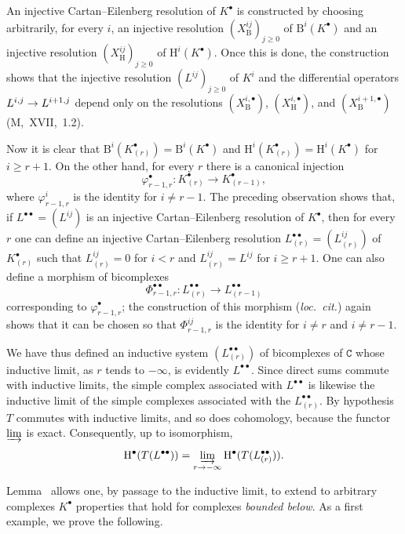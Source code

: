 \documentclass[oneside]{amsart}
\theoremstyle{ega-env-style}
\theoremstyle{ega-thm-env-style}
\theoremstyle{ega-defn-env-style}
\def\cat{\mathtt}                   %
\def\geq{\geqslant}                 %
\def\HH{\mathrm{H}}                 %
\renewcommand{\to}{\mathchoice{\longrightarrow}{\rightarrow}{\rightarrow}{\rightarrow}}
\begin{document}
An injective Cartan--Eilenberg resolution of $K^\bullet$ is constructed by choosing arbitrarily, for every $i$, an injective resolution $(X_{\mathrm{B}}^{ij})_{j\geq 0}$ of $\mathrm{B}^i(K^\bullet)$ and an injective resolution $(X_{\mathrm{H}}^{ij})_{j\geq 0}$ of $\HH^i(K^\bullet)$.
Once this is done, the construction shows that the injective resolution $(L^{ij})_{j\geq 0}$ of $K^i$ and the differential operators $L^{i,j}\to L^{i+1,j}$ depend only on the resolutions $(X_{\mathrm{B}}^{i,\bullet})$, $(X_{\mathrm{H}}^{i,\bullet})$, and $(X_{\mathrm{B}}^{i+1,\bullet})$ (M,~XVII,~1.2).

Now it is clear that $\mathrm{B}^i(K^\bullet_{(r)})=\mathrm{B}^i(K^\bullet)$ and $\HH^i(K^\bullet_{(r)})=\HH^i(K^\bullet)$ for $i\geq r+1$.
On the other hand, for every $r$ there is a canonical injection
\[
  \varphi^\bullet_{r-1,r}:K^\bullet_{(r)}\longrightarrow K^\bullet_{(r-1)},
\]
where $\varphi^i_{r-1,r}$ is the identity for $i\neq r-1$.
The preceding observation shows that, if $L^{\bullet\bullet}=(L^{ij})$ is an injective Cartan--Eilenberg resolution of $K^\bullet$, then for every $r$ one can define an injective Cartan--Eilenberg resolution $L^{\bullet\bullet}_{(r)}=(L^{ij}_{(r)})$ of $K^\bullet_{(r)}$ such that $L^{ij}_{(r)}=0$ for $i<r$ and $L^{ij}_{(r)}=L^{ij}$ for $i\geq r+1$.
One can also define a morphism of bicomplexes
\[
  \Phi^{\bullet\bullet}_{r-1,r}:L^{\bullet\bullet}_{(r)}
  \longrightarrow L^{\bullet\bullet}_{(r-1)}
\]
corresponding to $\varphi^\bullet_{r-1,r}$; the construction of this morphism (\emph{loc.\ cit.}) again shows that it can be chosen so that $\Phi^{ij}_{r-1,r}$ is the identity for $i\neq r$ and $i\neq r-1$.

We have thus defined an inductive system $(L^{\bullet\bullet}_{(r)})$ of bicomplexes of $\cat{C}$ whose inductive limit, as $r$ tends to $-\infty$, is evidently $L^{\bullet\bullet}$.
Since direct sums commute with inductive limits, the simple complex associated with $L^{\bullet\bullet}$ is likewise the inductive limit of the simple complexes associated with the $L^{\bullet\bullet}_{(r)}$.
By hypothesis $T$ commutes with inductive limits, and so does cohomology, because the functor $\varinjlim$ is exact.
Consequently, up to isomorphism,
\[
  \HH^\bullet(T(L^{\bullet\bullet}))
  =\varinjlim_{r\to-\infty}\HH^\bullet(T(L^{\bullet\bullet}_{(r)})).
\]

Lemma~ allows one, by passage to the inductive limit, to extend to arbitrary complexes $K^\bullet$ properties that hold for complexes \emph{bounded below}.
As a first example, we prove the following.
\end{document}
